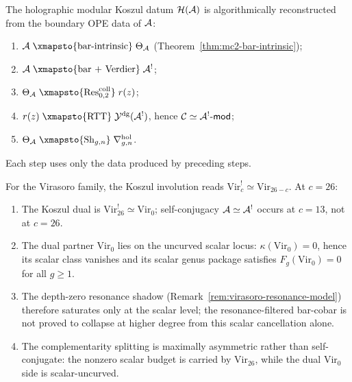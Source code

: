 \begin{theorem}\ClaimStatusProvedHere
\label{thm:thqg-g8-reconstruction}
The holographic modular Koszul datum $\mathcal{H}(\mathcal{A})$ is algorithmically
reconstructed from the boundary OPE data of $\mathcal{A}$:
\begin{enumerate}[label=\textup{(\roman*)}]
\item $\cA \;\xmapsto{\text{bar-intrinsic}}\; \Theta_\cA$
 (Theorem~\ref{thm:mc2-bar-intrinsic});
\item $\cA \;\xmapsto{\text{bar + Verdier}}\; \cA^!$;
\item $\Theta_\cA \;\xmapsto{\Res^{\mathrm{coll}}_{0,2}}\; r(z)$;
\item $r(z) \;\xmapsto{\text{RTT}}\; \Ydg(\cA^!)$, hence
 $\mathcal{C} \simeq \mathcal{A}^!\text{-}\mathsf{mod}$;
\item $\Theta_\cA \;\xmapsto{\operatorname{Sh}_{g,n}}\;
 \nabla^{\mathrm{hol}}_{g,n}$.
\end{enumerate}
Each step uses only the data produced by preceding steps.
\end{theorem}

\begin{theorem}\ClaimStatusProvedHere
\label{thm:thqg-g9-critical-string}
For the Virasoro family, the Koszul involution reads
$\mathrm{Vir}_c^! \simeq \mathrm{Vir}_{26-c}$. At $c = 26$:
\begin{enumerate}[label=\textup{(\roman*)}]
\item The Koszul dual is
 $\mathrm{Vir}_{26}^! \simeq \mathrm{Vir}_0$; self-conjugacy
 $\mathcal{A} \simeq \mathcal{A}^!$ occurs at $c = 13$, not at $c = 26$.
\item The dual partner $\mathrm{Vir}_0$ lies on the uncurved scalar
 locus: $\kappa(\mathrm{Vir}_0) = 0$, hence its scalar class vanishes
 and its scalar genus package satisfies
 $F_g(\mathrm{Vir}_0) = 0$ for all $g \geq 1$.
\item The depth-zero resonance shadow
 (Remark~\ref{rem:virasoro-resonance-model}) therefore saturates only
 at the scalar level; the resonance-filtered bar-cobar is not proved
 to collapse at higher degree from this scalar cancellation alone.
\item The complementarity splitting is maximally asymmetric rather than
 self-conjugate: the nonzero scalar budget is carried by
 $\mathrm{Vir}_{26}$, while the dual $\mathrm{Vir}_0$ side is
 scalar-uncurved.
\end{enumerate}
\end{theorem}

